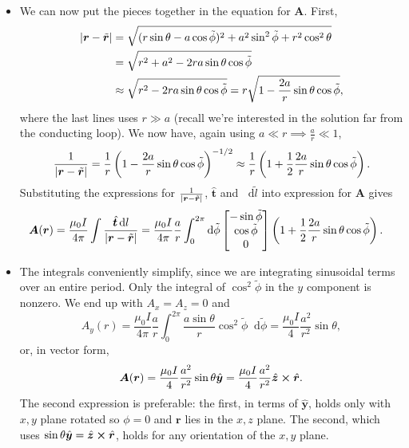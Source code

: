 \documentclass[11pt, a4paper]{article}
\newcommand{\diff}{\mathop{}\!\mathrm{d}} %
\renewcommand{\vec}[1]{\bm{#1}} %
\newcommand{\uvec}[1]{\hat{\vec{#1}}} %
\newcommand{\tvec}[1]{\tilde{\vec{#1}}} %
\renewcommand{\r}{\vec{r}}
\newcommand{\A}{\vec{A}}  %
\begin{document}
\begin{itemize}
	\item We can now put the pieces together in the equation for $ \A $. First,
	\begin{align*}
		\abs{\r - \tvec{r}} &= \sqrt{(r \sin \theta - a \cos \tilde{\phi} )^{2} + a^{2}\sin^{2}\tilde{\phi} + r^{2}\cos^{2} \theta}\\
		& = \sqrt{r^{2} + a^{2} - 2ra \sin \theta \cos \tilde \phi}\\
		&\approx \sqrt{r^{2} - 2ra \sin \theta \cos \tilde \phi} = r \sqrt{1 - \frac{2a}{r}\sin \theta \cos \tilde{\phi}},
	\end{align*}
	where the last lines uses $ r \gg a $ (recall we're interested in the solution far from the conducting loop). We now have, again using $ a \ll r \implies \frac{a}{r} \ll 1 $,
	\begin{equation*}
		\frac{1}{\abs{\r - \tvec{r}}} = \frac{1}{r} \left(1 - \frac{2a}{r}\sin \theta \cos \tilde{\phi}\right)^{-1/2} \approx \frac{1}{r}\left(1 + \frac{1}{2}  \frac{2a}{r}\sin \theta \cos \tilde{\phi}\right).
	\end{equation*}
	Substituting the expressions for $ \frac{1}{\abs{\r - \tvec{r}}} $, $ \uvec{t} $ and $ \diff \tilde{l} $ into expression for $ \A $ gives
	\begin{align*}
		\A(\r) &= \frac{\mu_{0}I}{4\pi} \int \frac{\uvec{t} \diff l}{\abs{\r - \tvec{r}}} = \frac{\mu_{0}I}{4\pi} \frac{a}{r} \int_{0}^{2\pi} \diff \tilde{\phi}  
		\begin{bmatrix}
			- \sin \tilde{\phi}\\
			\cos \tilde{\phi}\\
			0
		\end{bmatrix}
		\left(1 + \frac{1}{2}  \frac{2a}{r}\sin \theta \cos \tilde{\phi}\right).
	\end{align*}
	
	\item The integrals conveniently simplify, since we are integrating sinusoidal terms over an entire period. Only the integral of $ \cos^{2} \tilde{\phi} $ in the $ y $ component is nonzero. We end up with $ A_{x} = A_{z} = 0 $ and
	\begin{equation*}
		A_{y}(r) = \frac{\mu_{0}I}{4\pi} \frac{a}{r} \int_{0}^{2\pi}
		 \frac{a\sin \theta}{r} \cos^{2} \tilde{\phi} \diff \tilde{\phi} = \frac{\mu_{0}I}{4} \frac{a^{2}}{r^{2}}  \sin \theta,
	\end{equation*}
	or, in vector form,
	\begin{equation*}
		\A(\r) = \frac{\mu_{0}I}{4} \frac{a^{2}}{r^{2}}  \sin \theta \uvec{y} = \frac{\mu_{0}I}{4} \frac{a^{2}}{r^{2}} \uvec{z} \cross \uvec{r}.
	\end{equation*}
	The second expression is preferable: the first, in terms of $ \uvec{y} $, holds only with $ x, y $ plane rotated so $ \phi = 0 $ and $ \r $ lies in the $ x, z $ plane. The second, which uses $ \sin \theta \uvec{y} = \uvec{z} \cross \uvec{r} $, holds for any orientation of the $ x, y $ plane. 
	

\end{itemize}
\end{document}
